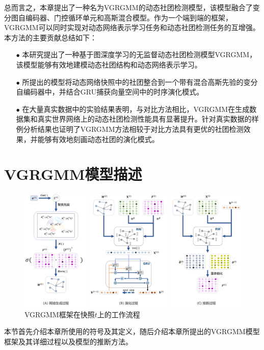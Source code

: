 总而言之，本章提出了一种名为VGRGMM的动态社团检测模型，该模型融合了变分图自编码器、门控循环单元和高斯混合模型。作为一个端到端的框架，VGRGMM可以同时实现对动态网络表示学习任务和动态社团检测任务的互增强。本方法的主要贡献总结如下：
\begin{itemize}
    \item[$\bullet$] 本研究提出了一种基于图深度学习的无监督动态社团检测模型VGRGMM，该模型能够有效地建模动态社团结构和动态网络表示学习。
    \item[$\bullet$] 所提出的模型将动态网络快照中的社团整合到一个带有混合高斯先验的变分自编码器中，并结合GRU捕获向量空间中的时序演化模式。
    \item[$\bullet$] 在大量真实数据中的实验结果表明，与对比方法相比，VGRGMM在生成数据集和真实世界网络上的动态社团检测性能具有显著提升。针对真实数据的样例分析结果也证明了VGRGMM方法相较于对比方法具有更优的社团检测效果，并能够有效地刻画动态社团的演化模式。
\end{itemize}


\section{VGRGMM模型描述\label{chap6:model}}

\begin{figure}
\centering 
\includegraphics[width=\textwidth]{figures/chap06/VGRGMM.png}
\caption{VGRGMM框架在快照$t$上的工作流程
} 
\label{fig1}
\end{figure}


本节首先介绍本章所使用的符号及其定义，随后介绍本章所提出的VGRGMM模型框架及其详细过程以及模型的推断方法。

